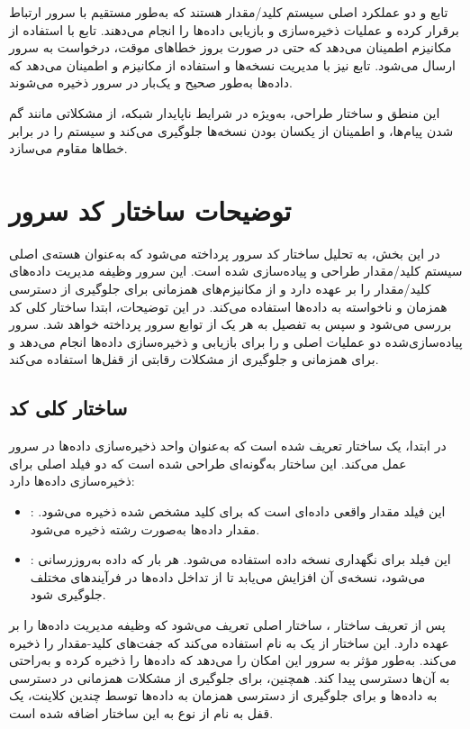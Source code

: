 تابع  و  دو عملکرد اصلی سیستم کلید/مقدار هستند که به‌طور مستقیم با سرور ارتباط برقرار کرده و عملیات ذخیره‌سازی و بازیابی داده‌ها را انجام می‌دهند. تابع  با استفاده از مکانیزم  اطمینان می‌دهد که حتی در صورت بروز خطاهای موقت، درخواست به سرور ارسال می‌شود. تابع  نیز با مدیریت نسخه‌ها و استفاده از مکانیزم  و  اطمینان می‌دهد که داده‌ها به‌طور صحیح و یک‌بار در سرور ذخیره می‌شوند.

این منطق و ساختار طراحی، به‌ویژه در شرایط ناپایدار شبکه، از مشکلاتی مانند گم شدن پیام‌ها،  و اطمینان از یکسان بودن نسخه‌ها جلوگیری می‌کند و سیستم را در برابر خطاها مقاوم می‌سازد.


\section*{توضیحات ساختار کد سرور }

در این بخش، به تحلیل ساختار کد سرور  پرداخته می‌شود که به‌عنوان هسته‌ی اصلی سیستم کلید/مقدار طراحی و پیاده‌سازی شده است. این سرور وظیفه مدیریت داده‌های کلید/مقدار را بر عهده دارد و از مکانیزم‌های همزمانی برای جلوگیری از دسترسی همزمان و ناخواسته به داده‌ها استفاده می‌کند. در این توضیحات، ابتدا ساختار کلی کد بررسی می‌شود و سپس به تفصیل به هر یک از توابع سرور پرداخته خواهد شد. سرور پیاده‌سازی‌شده دو عملیات اصلی  و  را برای بازیابی و ذخیره‌سازی داده‌ها انجام می‌دهد و برای همزمانی و جلوگیری از مشکلات رقابتی از قفل‌ها  استفاده می‌کند.

\subsection*{ساختار کلی کد}

در ابتدا، یک ساختار  تعریف شده است که به‌عنوان واحد ذخیره‌سازی داده‌ها در سرور عمل می‌کند. این ساختار به‌گونه‌ای طراحی شده است که دو فیلد اصلی برای ذخیره‌سازی داده‌ها دارد:
\begin{itemize}
  \item {}: این فیلد مقدار واقعی داده‌ای است که برای کلید مشخص شده ذخیره می‌شود. مقدار داده‌ها به‌صورت رشته ذخیره می‌شود.
  \item {}: این فیلد برای نگهداری نسخه داده استفاده می‌شود. هر بار که داده به‌روزرسانی می‌شود، نسخه‌ی آن افزایش می‌یابد تا از تداخل داده‌ها در فرآیندهای مختلف جلوگیری شود.
\end{itemize}

پس از تعریف ساختار ، ساختار اصلی  تعریف می‌شود که وظیفه مدیریت داده‌ها را بر عهده دارد. این ساختار از یک  به نام  استفاده می‌کند که جفت‌های کلید-مقدار را ذخیره می‌کند.  به‌طور مؤثر به سرور این امکان را می‌دهد که داده‌ها را ذخیره کرده و به‌راحتی به آن‌ها دسترسی پیدا کند. همچنین، برای جلوگیری از مشکلات همزمانی در دسترسی به داده‌ها و برای جلوگیری از دسترسی همزمان به داده‌ها توسط چندین کلاینت، یک قفل به نام  از نوع  به این ساختار اضافه شده است.

